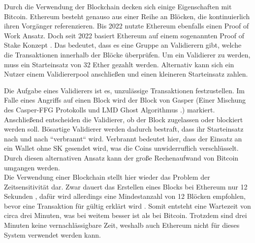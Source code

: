 \documentclass[
	fontsize=11pt,
	headings=small,
	parskip=half,           %
	bibliography=totoc,
	numbers=noenddot,       %
	open=any,               %
]{scrreprt}
\begin{document}
Durch die Verwendung der Blockchain decken sich einige Eigenschaften mit Bitcoin. Ethereum besteht genauso aus einer Reihe an Blöcken, die kontinuierlich ihren Vorgänger referenzieren. Bis 2022 nutzte Ethereum ebenfalls einen Proof of Work Ansatz. Doch seit 2022 basiert Ethereum auf einem sogenannten Proof of Stake Konzept \cite{eth-explainerInvestopia}. Das bedeutet, dass es eine Gruppe an Validierern gibt, welche die Transaktionen innerhalb der Blöcke überprüfen. Um ein Validierer zu werden, muss ein Starteinsatz von 32 Ether gezahlt werden. Alternativ kann sich ein Nutzer einem Validiererpool anschließen und einen kleineren Starteinsatz zahlen.

Die Aufgabe eines Validierers ist es, unzulässige Transaktionen festzustellen. Im Falle eines Angriffs auf einen Block wird der Block von Gasper (Einer Mischung des Casper-FFG Protokolls und LMD Ghost Algorithmus \cite{eth-buterin2020combining}.) markiert. Anschließend entscheiden die Validierer, ob der Block zugelassen oder blockiert werden soll. Bösartige Validierer werden dadurch bestraft, dass ihr Starteinsatz nach und nach ``verbrannt`` wird. Verbrannt bedeutet hier, dass der Einsatz an ein Wallet ohne SK gesendet wird, was die Coins unwiderruflich verschlüsselt. Durch diesen alternativen Ansatz kann der große Rechenaufwand von Bitcoin umgangen werden.\\

Die Verwendung einer Blockchain stellt hier wieder das Problem der Zeitsensitivität dar. Zwar dauert das Erstellen eines Blocks bei Ethereum nur 12 Sekunden \cite{eth-timePerBlock}, dafür wird allerdings eine Mindestanzahl von 12 Blöcken empfohlen, bevor eine Transaktion für gültig erklärt wird \cite{eth-xu2017taxonomy}. Somit entsteht eine Wartezeit von circa drei Minuten, was bei weitem besser ist als bei Bitcoin. Trotzdem sind drei Minuten keine vernachlässigbare Zeit, weshalb auch Ethereum nicht für dieses System verwendet werden kann.
\end{document}
